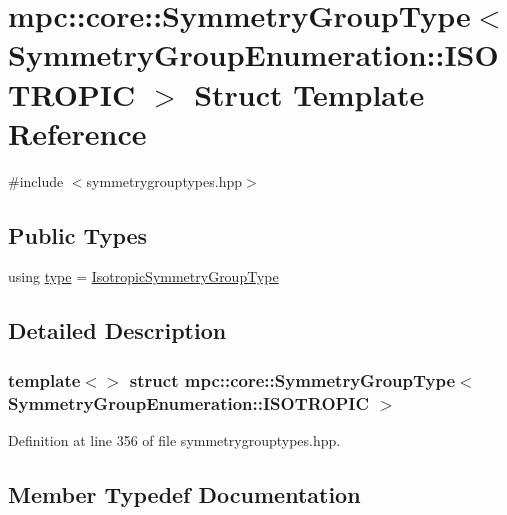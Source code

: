 \hypertarget{structmpc_1_1core_1_1_symmetry_group_type_3_01_symmetry_group_enumeration_1_1_i_s_o_t_r_o_p_i_c_01_4}{}\section{mpc\+:\+:core\+:\+:Symmetry\+Group\+Type$<$ Symmetry\+Group\+Enumeration\+:\+:I\+S\+O\+T\+R\+O\+P\+IC $>$ Struct Template Reference}
\label{structmpc_1_1core_1_1_symmetry_group_type_3_01_symmetry_group_enumeration_1_1_i_s_o_t_r_o_p_i_c_01_4}


{\ttfamily \#include $<$symmetrygrouptypes.\+hpp$>$}

\subsection*{Public Types}
\begin{DoxyCompactItemize}
\item 
using \mbox{\hyperlink{structmpc_1_1core_1_1_symmetry_group_type_3_01_symmetry_group_enumeration_1_1_i_s_o_t_r_o_p_i_c_01_4_a8f392bfab082bbb0e49b422b3601e73a}{type}} = \mbox{\hyperlink{structmpc_1_1core_1_1_isotropic_symmetry_group_type}{Isotropic\+Symmetry\+Group\+Type}}
\end{DoxyCompactItemize}


\subsection{Detailed Description}
\subsubsection*{template$<$$>$\newline
struct mpc\+::core\+::\+Symmetry\+Group\+Type$<$ Symmetry\+Group\+Enumeration\+::\+I\+S\+O\+T\+R\+O\+P\+I\+C $>$}



Definition at line 356 of file symmetrygrouptypes.\+hpp.



\subsection{Member Typedef Documentation}
\mbox{\label{structmpc_1_1core_1_1_symmetry_group_type_3_01_symmetry_group_enumeration_1_1_i_s_o_t_r_o_p_i_c_01_4_a8f392bfab082bbb0e49b422b3601e73a}} 
